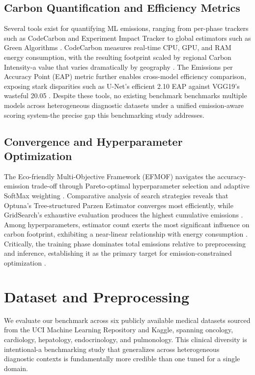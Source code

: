 \documentclass[conference]{IEEEtran}
\begin{document}
\subsection{Carbon Quantification and Efficiency Metrics}
Several tools exist for quantifying ML emissions, ranging from per-phase 
trackers such as CodeCarbon and Experiment Impact Tracker to global estimators 
such as Green Algorithms \cite{b3}. CodeCarbon measures real-time CPU, GPU, 
and RAM energy consumption, with the resulting footprint scaled by regional 
Carbon Intensity-a value that varies dramatically by geography \cite{b3}. 
The Emissions per Accuracy Point (EAP) metric further enables cross-model 
efficiency comparison, exposing stark disparities such as U-Net's efficient 
2.10 EAP against VGG19's wasteful 20.05 \cite{b3}. Despite these tools, 
no existing benchmark benchmarks multiple models across heterogeneous 
diagnostic datasets under a unified emission-aware scoring system-the 
precise gap this benchmarking study addresses.

\subsection{Convergence and Hyperparameter Optimization}
The Eco-friendly Multi-Objective Framework (EFMOF) navigates the 
accuracy-emission trade-off through Pareto-optimal hyperparameter selection 
and adaptive SoftMax weighting \cite{b2}. Comparative analysis of search 
strategies reveals that Optuna's Tree-structured Parzen Estimator converges 
most efficiently, while GridSearch's exhaustive evaluation produces the 
highest cumulative emissions \cite{b2}. Among hyperparameters, estimator 
count exerts the most significant influence on carbon footprint, exhibiting 
a near-linear relationship with energy consumption \cite{b2}. Critically, 
the training phase dominates total emissions relative to preprocessing and 
inference, establishing it as the primary target for emission-constrained 
optimization \cite{b3}.

\section{Dataset and Preprocessing}

We evaluate our benchmark across six publicly available medical datasets sourced 
from the UCI Machine Learning Repository and Kaggle, spanning oncology, 
cardiology, hepatology, endocrinology, and pulmonology. This clinical diversity 
is intentional-a benchmarking study that generalizes across heterogeneous 
diagnostic contexts is fundamentally more credible than one tuned for a single 
domain.
\end{document}
